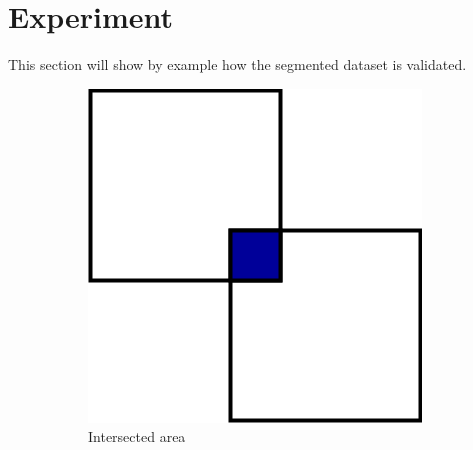 \section{Experiment} %
\label{sec:experiment}

This section will show by example how the segmented dataset is validated.  



\begin{figure}[ht]
  \centering
  \begin{subfigure}{0.25\textwidth}
    \centering
    \includegraphics[width=\textwidth]{./images/experiment/intersection.png}
    \caption{Intersected area}
    \label{fig:experiment:intersection}
  \end{subfigure}
  \begin{subfigure}{0.25\textwidth}
    \centering

\end{subfigure}
\end{figure}
